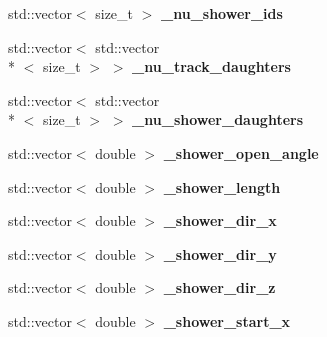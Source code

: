 \begin{DoxyCompactItemize}
\item 
\hypertarget{group__lee_ga063d4fec5b4b40b812147b1b77be79a3}{std\-::vector$<$ size\-\_\-t $>$ {\bfseries \-\_\-nu\-\_\-shower\-\_\-ids}}\label{group__lee_ga063d4fec5b4b40b812147b1b77be79a3}

\item 
\hypertarget{group__lee_gacb2657deb7fca8bcf8c97952d7a012cf}{std\-::vector$<$ std\-::vector\\*
$<$ size\-\_\-t $>$ $>$ {\bfseries \-\_\-nu\-\_\-track\-\_\-daughters}}\label{group__lee_gacb2657deb7fca8bcf8c97952d7a012cf}

\item 
\hypertarget{group__lee_ga4d78972623fa65077421a091e226f61f}{std\-::vector$<$ std\-::vector\\*
$<$ size\-\_\-t $>$ $>$ {\bfseries \-\_\-nu\-\_\-shower\-\_\-daughters}}\label{group__lee_ga4d78972623fa65077421a091e226f61f}

\item 
\hypertarget{group__lee_ga9e637e1f18334830d94136b89c4d0138}{std\-::vector$<$ double $>$ {\bfseries \-\_\-shower\-\_\-open\-\_\-angle}}\label{group__lee_ga9e637e1f18334830d94136b89c4d0138}

\item 
\hypertarget{group__lee_ga88255d9d3a3a401c834d624076c30d5b}{std\-::vector$<$ double $>$ {\bfseries \-\_\-shower\-\_\-length}}\label{group__lee_ga88255d9d3a3a401c834d624076c30d5b}

\item 
\hypertarget{group__lee_gaac6afc45d77fbbfb38addc97038e1893}{std\-::vector$<$ double $>$ {\bfseries \-\_\-shower\-\_\-dir\-\_\-x}}\label{group__lee_gaac6afc45d77fbbfb38addc97038e1893}

\item 
\hypertarget{group__lee_gaa08672578dd6c1729649fa54a1725401}{std\-::vector$<$ double $>$ {\bfseries \-\_\-shower\-\_\-dir\-\_\-y}}\label{group__lee_gaa08672578dd6c1729649fa54a1725401}

\item 
\hypertarget{group__lee_gaee2bf39916f97db6bee077df4020662f}{std\-::vector$<$ double $>$ {\bfseries \-\_\-shower\-\_\-dir\-\_\-z}}\label{group__lee_gaee2bf39916f97db6bee077df4020662f}

\item 
\hypertarget{group__lee_ga8d3d2b24d81dc924d1f972bf3748dd76}{std\-::vector$<$ double $>$ {\bfseries \-\_\-shower\-\_\-start\-\_\-x}}\label{group__lee_ga8d3d2b24d81dc924d1f972bf3748dd76}


\end{DoxyCompactItemize}
